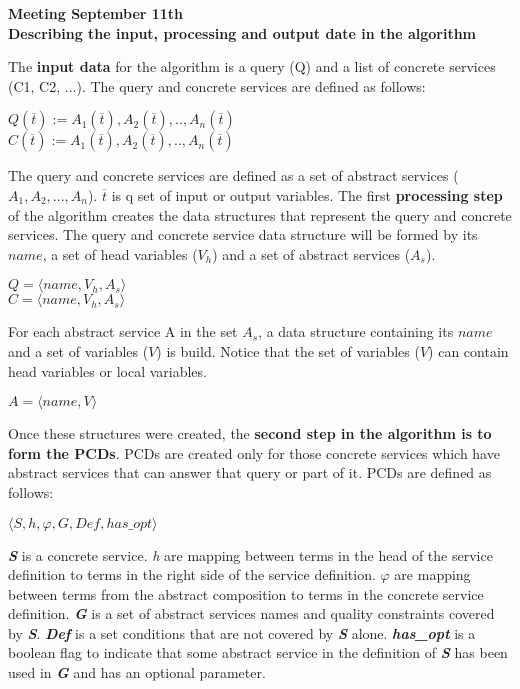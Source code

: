 \documentclass[12pt,a4paper,oneside]{report}
\begin{document}
\begin{center}
\textbf{\large{Meeting September 11th}} \\
\textbf{Describing the input, processing and output date in the algorithm}
\end{center}

The \textbf{input data} for the algorithm is a query (Q) and a list of concrete services (C1, C2, ...). The query and concrete services are defined as follows:

\begin{center}
$Q (\overline{t}) := A_{1}(\overline{t}), A_{2}(\overline{t}), ..,  A_{n}(\overline{t})$ \\
$C (\overline{t}) := A_{1}(\overline{t}), A_{2}(\overline{t}), ..,  A_{n}(\overline{t})$
\end{center}

The query and concrete services are defined as a set of abstract services ($A_{1}, A_{2}, ..., A_{n}$). $\overline{t}$ is q set of input or output variables. The first \textbf{processing step} of the algorithm creates the data structures that represent the query and concrete services. The query and concrete service data structure will be formed by its $name$, a set of head variables ($V_{h}$) and a set of abstract services ($A_{s}$).

\begin{center}
$Q = \langle name, V_{h}, A_{s} \rangle$ \\
$C = \langle name, V_{h}, A_{s} \rangle$
\end{center}

For each abstract service A in the set $A_{s}$, a data structure containing its $name$ and a set of variables ($V$) is build. Notice that the set of variables ($V$) can contain head variables or local variables.

\begin{center}
$A = \langle name, V\rangle$
\end{center}

Once these structures were created, the \textbf{second step in the algorithm is to form the PCDs}. PCDs are created only for those concrete services which have abstract services that can answer that query or part of it. PCDs are defined as follows:

\begin{center}
$\langle S, h, \varphi, G, Def, has\_opt\rangle$
\end{center}

\textbf{\textit{S}} is a concrete service. \textit{h} are mapping between terms in the head of the service definition to terms in the right side of the service definition. \textbf{\textit{$\varphi$}} are mapping between terms from the abstract composition to terms in the concrete service definition. \textbf{\textit{G}} is a set of abstract services names and quality constraints covered by \textbf{\textit{S}}. \textbf{\textit{Def}} is a set conditions that are not covered by \textbf{\textit{S}} alone.\textbf{ \textit{has\_opt}} is a boolean flag to indicate that some abstract service in the definition of \textbf{\textit{S}} has been used in \textbf{\textit{G}} and has an optional parameter.
\end{document}
